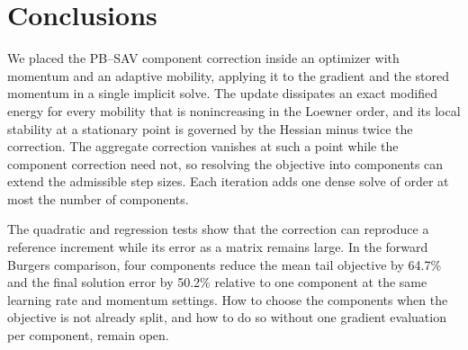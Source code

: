 \section{Conclusions}
\label{sec:conclusion}

We placed the PB--SAV component correction inside an optimizer with momentum
and an adaptive mobility, applying it to the gradient and the stored momentum
in a single implicit solve. The update dissipates an exact modified energy for
every mobility that is nonincreasing in the Loewner order, and its local
stability at a stationary point is governed by the Hessian minus twice the
correction. The aggregate correction vanishes at such a point while the
component correction need not, so resolving the objective into components can
extend the admissible step sizes. Each iteration adds one dense solve of order
at most the number of components.

The quadratic and regression tests show that the correction can reproduce a
reference increment while its error as a matrix remains large. In the forward
Burgers comparison, four components reduce the mean tail objective by 64.7\%
and the final solution error by 50.2\% relative to one component at the same
learning rate and momentum settings. How to choose the components when the
objective is not already split, and how to do so without one gradient
evaluation per component, remain open.
